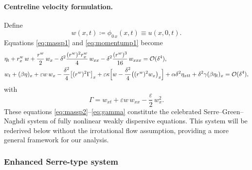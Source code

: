 \documentclass[alpha-refs, 12pt]{wiley-article}
\renewcommand{\O}{\mathcal{O}}
\begin{document}
\paragraph{Centreline velocity formulation.} Define
\[
  w(x,t)\coloneqq\phi_{0\,x}(x,t) \equiv u(x,0,t).
\]
Equations \eqref{eq:massp1} and \eqref{eq:momentump1} become
\begin{align}
  &\eta_{t}
   +r^{w}_{x}\,w
   +\frac{r^{w}}{2}\,w_{x}
   -\delta^{2}\frac{(r^{w})^{2}r^{w}_{x}}{4}\,w_{xx}
   -\delta^{2}\frac{(r^{w})^{3}}{16}\,w_{xxx}
   =\O(\delta^{4}),\label{eq:massp2}\\
  &w_{t}+(\beta\eta)_{x}
   +\varepsilon w\,w_{x}
   -\frac{\delta^{2}}{4}\bigl[(r^{w})^{2}\Gamma\bigr]_{x}
   +\varepsilon\kappa
      \Bigl[w-\frac{\delta^{2}}{4}\bigl((r^{w})^{2}w_{x}\bigr)_{x}\Bigr]
   +\alpha\delta^{2}\eta_{x t t}
   +\delta^{2}\gamma(\beta\eta_{t})_{x}
   = \O(\delta^{4}),\label{eq:momentump2}
\end{align}
with
\begin{equation}\label{eq:gamma}
  \Gamma=w_{x t}
         +\varepsilon w\,w_{xx}
         -\frac{\varepsilon}{2}\,w_{x}^{2}.
\end{equation}
These equations \eqref{eq:massp2}--\eqref{eq:gamma} constitute the celebrated Serre--Green--Naghdi system of fully nonlinear weakly dispersive equations. This system will be rederived below without the irrotational flow assumption, providing a more general framework for our analysis.

\subsubsection{Enhanced Serre-type system}\label{sec:cbsys}
\end{document}
